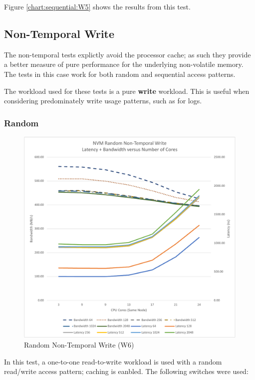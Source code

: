 Figure \ref{chart:sequential:W5} shows the results from this test.


\subsection{Non-Temporal Write}

The non-temporal tests explictly avoid the processor cache;
as such they provide a better measure of pure performance for
the underlying non-volatile memory.  The tests in this case
work for both random and sequential access patterns.

The workload used for these tests is a pure \textbf{write}
workload.  This is useful when considering predominately write
usage patterns, such as for logs.

\subsubsection{Random}

\begin{figure}
    \centering
    \caption{Random Non-Temporal Write (W6)}\label{chart:random:W6}
    \includegraphics[scale=0.5]{charts/random-w6-crop.pdf}
\end{figure}

In this test, a one-to-one read-to-write workload is used with
a random read/write access pattern; caching is eanbled.  The
following switches were used:

